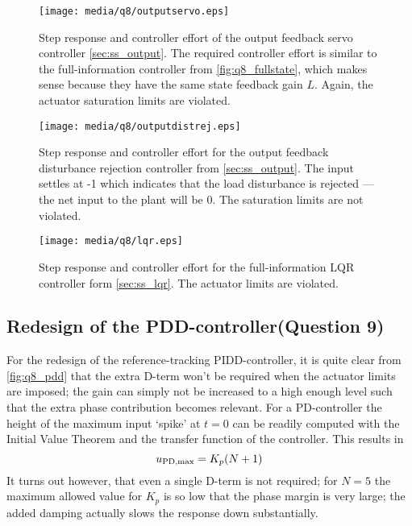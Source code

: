 \begin{figure}[ht!]
    \centering
    \texttt{[image: media/q8/outputservo.eps]}
    \caption{Step response and controller effort of the output feedback servo controller \cref{sec:ss_output}. The required controller effort is similar to the full-information controller from \cref{fig:q8_fullstate}, which makes sense because they have the same state feedback gain $L$. Again, the actuator saturation limits are violated.}
    \label{fig:q8_outputservo}
\end{figure}

\begin{figure}[ht!]
    \centering
    \texttt{[image: media/q8/outputdistrej.eps]}
    \caption{Step response and controller effort for the output feedback disturbance rejection controller from \cref{sec:ss_output}. The input settles at -1 which indicates that the load disturbance is rejected --- the net input to the plant will be 0. The saturation limits are not violated.}
    \label{fig:q8_outputdistrej}
\end{figure}

\begin{figure}[ht!]
    \centering
    \texttt{[image: media/q8/lqr.eps]}
    \caption{Step response and controller effort for the full-information LQR controller form \cref{sec:ss_lqr}. The actuator limits are violated.}
    \label{fig:q8_lqr}
\end{figure}

\subsection{Redesign of the PDD-controller\textnormal{\phantom{xxx}(Question 9)}}
\label{sec:retunepid}
For the redesign of the reference-tracking PIDD-controller, it is quite clear from \cref{fig:q8_pdd} that the extra D-term won't be required when the actuator limits are imposed; the gain can simply not be increased to a high enough level such that the extra phase contribution becomes relevant. For a PD-controller the height of the maximum input `spike' at $t=0$ can be readily computed with the Initial Value Theorem and the transfer function of the controller. This results in
$$ u_{\text{PD,max}} = K_p\qty(N + 1)$$
It turns out however, that even a single D-term is not required; for $N = 5$ the maximum allowed value for $K_p$ is so low that the phase margin is very large; the added damping actually slows the response down substantially. 

